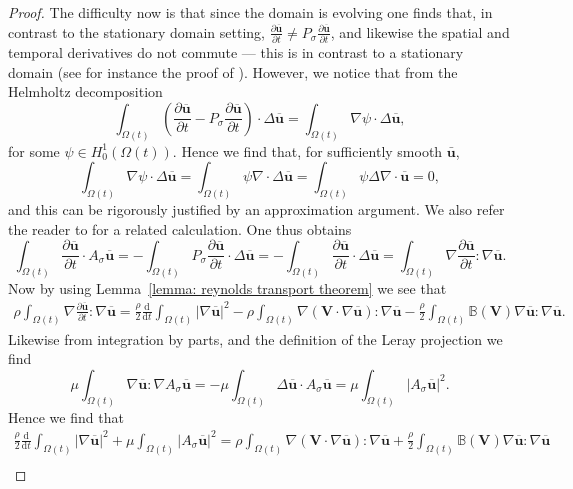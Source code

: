 \documentclass[a4paper]{amsart}
\numberwithin{equation}{section}
\newcommand{\ddt}[1]{\frac{\partial #1}{\partial t}}
\newcommand{\grad}{\nabla}
\newcommand{\Div}{\nabla \cdot}
\theoremstyle{plain}
\newcommand{\mbf}[1]{\mathbf{#1}}
\newcommand{\mbb}[1]{\mathbb{#1}}
\begin{document}
\begin{proof}
        The difficulty now is that since the domain is evolving one finds that, in contrast to the stationary domain setting, $\ddt{\overline{\mbf{u}}} \neq P_\sigma \ddt{\overline{\mbf{u}}}$, and likewise the spatial and temporal derivatives do not commute --- this is in contrast to a stationary domain (see for instance the proof of \cite[Theorem 6.8]{robinson2016three}).
        However, we notice that from the Helmholtz decomposition
        \[ \int_{\Omega(t)} \left( \ddt{\overline{\mbf{u}}} - P_\sigma  \ddt{\overline{\mbf{u}}}\right) \cdot \Delta \overline{\mbf{u}} = \int_{\Omega(t)} \grad \psi \cdot \Delta \overline{\mbf{u}}, \]
        for some $\psi \in H_0^1(\Omega(t))$.
        Hence we find that, for sufficiently smooth $\bar{\mbf{u}}$,
        \[ \int_{\Omega(t)} \grad \psi \cdot \Delta \overline{\mbf{u}} = \int_{\Omega(t)}  \psi \Div \Delta \overline{\mbf{u}} = \int_{\Omega(t)} \psi \Delta \Div \overline{\mbf{u}} = 0,\]
        and this can be rigorously justified by an approximation argument.
        We also refer the reader to \cite[p.166]{salvi1988navier} for a related calculation.
        One thus obtains
        \[ \int_{\Omega(t)} \ddt{\overline{\mbf{u}}} \cdot A_{\sigma}\overline{\mbf{u}} = -\int_{\Omega(t)} P_\sigma \ddt{\overline{\mbf{u}}} \cdot \Delta \overline{\mbf{u}} = -\int_{\Omega(t)} \ddt{\overline{\mbf{u}}} \cdot \Delta \overline{\mbf{u}} = \int_{\Omega(t)} \grad\ddt{\overline{\mbf{u}}}: \grad \overline{\mbf{u}}. \]
	Now by using Lemma~\ref{lemma: reynolds transport theorem} we see that
	\begin{align*}
		\rho \int_{\Omega(t)} \grad\ddt{\overline{\mbf{u}}}: \grad \overline{\mbf{u}} = \frac{\rho}{2} \frac{\mathrm{d}}{\mathrm{d}t} \int_{\Omega(t)} |\grad \overline{\mbf{u}}|^2 - \rho \int_{\Omega(t)} \grad(\mbf{V} \cdot \grad \overline{\mbf{u}}): \grad \overline{\mbf{u}} - \frac{\rho}{2} \int_{\Omega(t)} \mbb{B}(\mbf{V}) \grad \overline{\mbf{u}} : \grad \overline{\mbf{u}}.
	\end{align*}
    Likewise from integration by parts, and the definition of the Leray projection we find
    \[ \mu \int_{\Omega(t)} \grad\overline{\mbf{u}}:\grad A_{\sigma} \overline{\mbf{u}} = -\mu \int_{\Omega(t)} \Delta\overline{\mbf{u}} \cdot A_{\sigma} \overline{\mbf{u}} = \mu \int_{\Omega(t)} |A_{\sigma} \overline{\mbf{u}}|^2. \]
	Hence we find that
	\begin{multline}
        \frac{\rho}{2} \frac{\mathrm{d}}{\mathrm{d}t} \int_{\Omega(t)} |\grad \overline{\mbf{u}}|^2 + \mu \int_{\Omega(t)} |A_{\sigma} \overline{\mbf{u}}|^2 = \rho \int_{\Omega(t)} \grad(\mbf{V} \cdot \grad \overline{\mbf{u}}): \grad \overline{\mbf{u}} + \frac{\rho}{2} \int_{\Omega(t)} \mbb{B}(\mbf{V}) \grad \overline{\mbf{u}} : \grad \overline{\mbf{u}}\\

\end{multline}
\end{proof}
\end{document}
